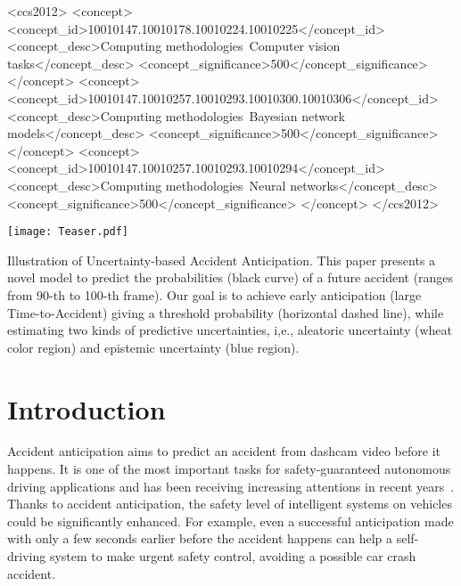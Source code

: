 \documentclass[sigconf]{acmart}
\begin{document}
\begin{CCSXML}
<ccs2012>
   <concept>
       <concept_id>10010147.10010178.10010224.10010225</concept_id>
       <concept_desc>Computing methodologies~Computer vision tasks</concept_desc>
       <concept_significance>500</concept_significance>
       </concept>
   <concept>
       <concept_id>10010147.10010257.10010293.10010300.10010306</concept_id>
       <concept_desc>Computing methodologies~Bayesian network models</concept_desc>
       <concept_significance>500</concept_significance>
       </concept>
    <concept>
       <concept_id>10010147.10010257.10010293.10010294</concept_id>
       <concept_desc>Computing methodologies~Neural networks</concept_desc>
       <concept_significance>500</concept_significance>
       </concept>
 </ccs2012>
\end{CCSXML}



\begin{teaserfigure}
  \texttt{[image: Teaser.pdf]}
  \caption{Illustration of Uncertainty-based Accident Anticipation. This paper presents a novel model to predict the probabilities (black curve) of a future accident (ranges from 90-th to 100-th frame). Our goal is to achieve early anticipation (large Time-to-Accident) giving a threshold probability (horizontal dashed line), while estimating two kinds of predictive uncertainties, i,e., aleatoric uncertainty (wheat color region) and epistemic uncertainty (blue region).}
\label{fig:teaser}
\end{teaserfigure}

\maketitle

\section{Introduction}
Accident anticipation aims to predict an accident from dashcam video before it happens. It is one of the most important tasks for safety-guaranteed autonomous driving applications and has been receiving increasing attentions in recent years~\cite{ChanACCV2016,SuzukiCVPR2018,FangITSC2019,CorcoranCRV2019}. Thanks to accident anticipation, the safety level of intelligent systems on vehicles could be significantly enhanced. For example, even a successful anticipation made with only a few seconds earlier before the accident happens can help a self-driving system to make urgent safety control, avoiding a possible car crash accident.
\end{document}
